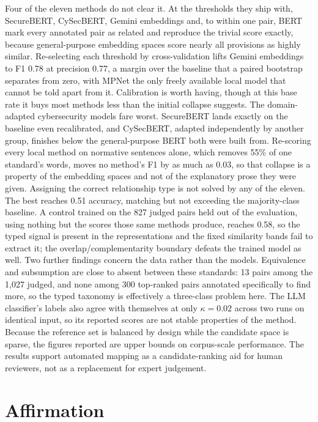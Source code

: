 Four of the eleven methods do not clear it. At the thresholds they ship with,
SecureBERT, CySecBERT, Gemini embeddings and, to within one pair, BERT mark every
annotated pair as related and reproduce the trivial score exactly, because
general-purpose embedding spaces score nearly all provisions as highly similar.
Re-selecting each threshold by cross-validation lifts Gemini embeddings to F1
0.78 at precision 0.77, a margin over the baseline that a paired bootstrap
separates from zero, with MPNet the only freely available local model that cannot
be told apart from it. Calibration is worth having, though at this base rate it
buys most methods less than the initial collapse suggests. The domain-adapted
cybersecurity models fare worst. SecureBERT lands exactly on the baseline even
recalibrated, and CySecBERT, adapted independently by another group, finishes
below the general-purpose BERT both were built from. Re-scoring every local method
on normative sentences alone, which removes 55\% of one standard's words, moves no
method's F1 by as much as 0.03, so that collapse is a property of the embedding
spaces and not of the explanatory prose they were given.
Assigning the correct relationship type is not solved by any of the eleven. The
best reaches 0.51 accuracy, matching but not exceeding the majority-class
baseline. A control trained on the 827 judged pairs held out of the evaluation,
using nothing but the scores those same methods produce, reaches 0.58, so the
typed signal is present in the representations and the fixed similarity bands fail
to extract it; the overlap/complementarity boundary defeats the trained model as
well. Two further
findings concern the data rather than the models. Equivalence and subsumption are
close to absent between these standards: 13 pairs among the 1{,}027 judged, and
none among 300 top-ranked pairs annotated specifically to find more, so the typed
taxonomy is effectively a three-class problem here. The LLM classifier's labels
also agree with themselves at only $\kappa = 0.02$ across two runs on identical
input, so its reported scores are not stable properties of the method. Because the
reference set is balanced by design while the candidate space is sparse, the
figures reported are upper bounds on corpus-scale performance. The results support
automated mapping as a candidate-ranking aid for human reviewers, not as a
replacement for expert judgement.
\clearpage

\chapter*{Affirmation}

